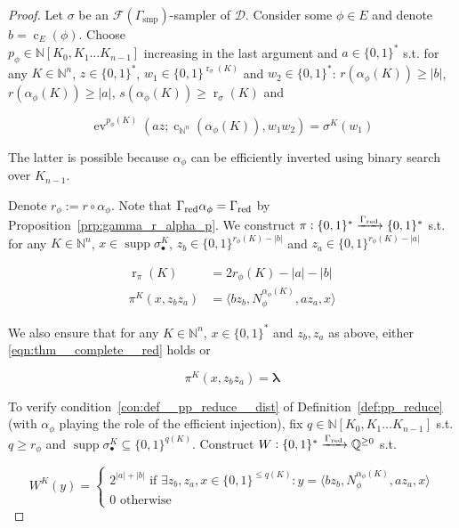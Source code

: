 \documentclass{article}
\numberwithin{equation}{section}
\theoremstyle{definition}
\theoremstyle{plain}
\newcommand{\Bool}{\{0,1\}}
\newcommand{\Words}{{\Bool^*}}
\DeclareMathOperator{\Supp}{supp}
\DeclareMathOperator{\Ev}{ev}
\DeclareMathOperator{\R}{r}
\DeclareMathOperator{\En}{c}
\newcommand{\Nats}{\mathbb{N}}
\newcommand{\Rats}{\mathbb{Q}}
\newcommand{\NatPoly}{\Nats[K_0, K_1 \ldots K_{n-1}]}
\newcommand{\Estr}{\bm{\lambda}}
\newcommand{\Abs}[1]{\lvert #1 \rvert}
\newcommand{\Chev}[1]{\langle #1 \rangle}
\newcommand{\Dist}{\mathcal{D}}
\newcommand{\Fall}{\mathcal{F}}
\begin{document}
\begin{proof}

Let ${\sigma}$ be an ${\Fall(\Gamma_{\text{smp}})}$-sampler of ${\Dist}$. Consider some ${\phi \in E}$ and denote ${b=\En_E(\phi)}$. Choose\\ ${p_\phi \in \NatPoly}$ increasing in the last argument and ${a \in \Words}$ s.t. for any ${K \in \Nats^{n}}$, ${z \in \Words}$, ${w_1 \in \Bool^{\R_\sigma(K)}}$ and ${w_2 \in \Words}$: ${r(\alpha_\phi(K)) \geq \Abs{b}}$, ${r(\alpha_\phi(K)) \geq \Abs{a}}$, ${s(\alpha_\phi(K)) \geq \R_\sigma(K)}$ and 

\[\Ev^{p_\phi(K)}(az;\En_{\Nats^n}(\alpha_\phi(K)),w_1 w_2)=\sigma^{K}(w_1)\]

The latter is possible because ${\alpha_\phi}$ can be efficiently inverted using binary search over ${K_{n-1}}$.

Denote ${r_\phi := r \circ \alpha_\phi}$. Note that ${\Gamma_{\textnormal{red}} \alpha_\phi = \Gamma_{\textnormal{red}}}$ by Proposition~\ref{prp:gamma_r_alpha_p}. We construct ${\pi: \Words \xrightarrow{\Gamma_{\textnormal{red}}} \Words}$ s.t. for any ${K \in \Nats^{n}}$, ${x \in \Supp \sigma_{\bullet}^{K}}$, ${z_b \in \Bool^{r_\phi(K)-\Abs{b}}}$ and ${z_a \in \Bool^{r_\phi(K)-\Abs{a}}}$

\begin{align}
\R_\pi(K) &= 2r_\phi(K)-\Abs{a}-\Abs{b} \\
\label{eqn:thm__complete__red}\pi^{K}(x,z_b z_a)&=\Chev{bz_b,N_\phi^{\alpha_\phi(K)},a z_a, x} 
\end{align}

We also ensure that for any ${K \in \Nats^n}$, ${x \in \Words}$ and ${z_b,z_a}$ as above, either \ref{eqn:thm__complete__red} holds or 

\[\pi^K(x,z_b z_a)=\Estr\]

To verify condition~\ref{con:def__pp_reduce__dist} of Definition~\ref{def:pp_reduce} (with ${\alpha_\phi}$ playing the role of the efficient injection), fix ${q \in \NatPoly}$ s.t. $q \geq r_\phi$ and $\Supp \sigma_\bullet^K \subseteq \Bool^{q(K)}$. Construct ${W: \Words \xrightarrow{\Gamma_{\textnormal{red}}} \Rats^{\geq 0}}$ s.t. 

\[W^K(y)=\begin{cases}2^{\Abs{a}+\Abs{b}} \text{ if } \exists z_b,z_a,x \in \Bool^{\leq q(K)}: y=\Chev{bz_b,N_\phi^{\alpha_\phi(K)}, az_a,x}\\0 \text{ otherwise}\end{cases}\]


\end{proof}
\end{document}
